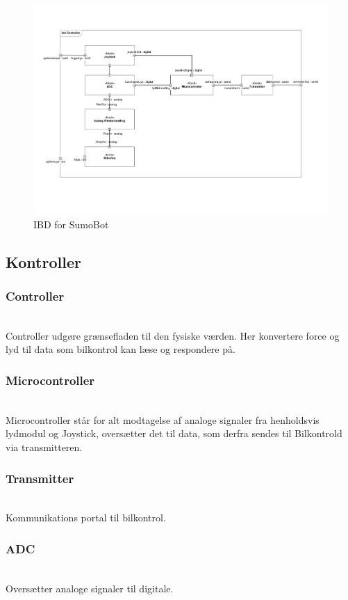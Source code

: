 \begin{figure}
	\centering
   	\includegraphics[page=3,width=1\linewidth]{figs/Diagrammer/IBD_SumoBot_BilKontrol_Controller.pdf}
	\caption{IBD for SumoBot}
	\label{fig:IBD_SumoBot}
\end{figure}

\subsection{Kontroller}
\subsubsection*{\textbf{Controller}}\hfill\\
Controller udgøre grænsefladen til den fysiske værden. Her konvertere force og lyd til data som bilkontrol kan læse og respondere på.
\subsubsection*{\textbf{Microcontroller}}\hfill\\
Microcontroller står for alt modtagelse af analoge signaler fra henholdsvis lydmodul og Joystick, oversætter det til data, som derfra sendes til Bilkontrold via transmitteren.
\subsubsection*{\textbf{Transmitter}}\hfill\\
Kommunikations portal til bilkontrol.
\subsubsection*{\textbf{ADC}}\hfill\\
Oversætter analoge signaler til digitale.
